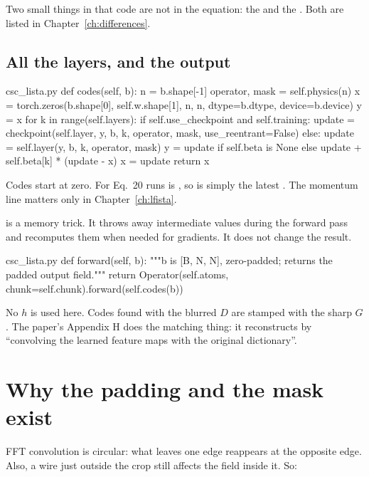 Two small things in that code are not in the equation: the  and the .
Both are listed in Chapter~\ref{ch:differences}.

\subsection*{All the layers, and the output}

\begin{code*}{csc_lista.py}
    def codes(self, b):
        n = b.shape[-1]
        operator, mask = self.physics(n)
        x = torch.zeros(b.shape[0], self.w.shape[1], n, n, dtype=b.dtype, device=b.device)
        y = x
        for k in range(self.layers):
            if self.use_checkpoint and self.training:
                update = checkpoint(self.layer, y, b, k, operator, mask, use_reentrant=False)
            else:
                update = self.layer(y, b, k, operator, mask)
            y = update if self.beta is None else update + self.beta[k] * (update - x)
            x = update
        return x
\end{code*}

Codes start at zero. For Eq.~20 runs  is , so  is simply the latest
. The momentum line matters only in Chapter~\ref{ch:lfista}.

 is a memory trick. It throws away intermediate values during the forward pass and
recomputes them when needed for gradients. It does not change the result.

\begin{code*}{csc_lista.py}
    def forward(self, b):
        """b is [B, N, N], zero-padded; returns the padded output field."""
        return Operator(self.atoms, chunk=self.chunk).forward(self.codes(b))
\end{code*}

No $h$ is used here. Codes found with the blurred $D$ are stamped with the sharp $G$. The paper's
Appendix H does the matching thing: it reconstructs by ``convolving the learned feature maps with the
original dictionary''.

\section{Why the padding and the mask exist}

FFT convolution is circular: what leaves one edge reappears at the opposite edge. Also, a wire just
outside the crop still affects the field inside it. So:

